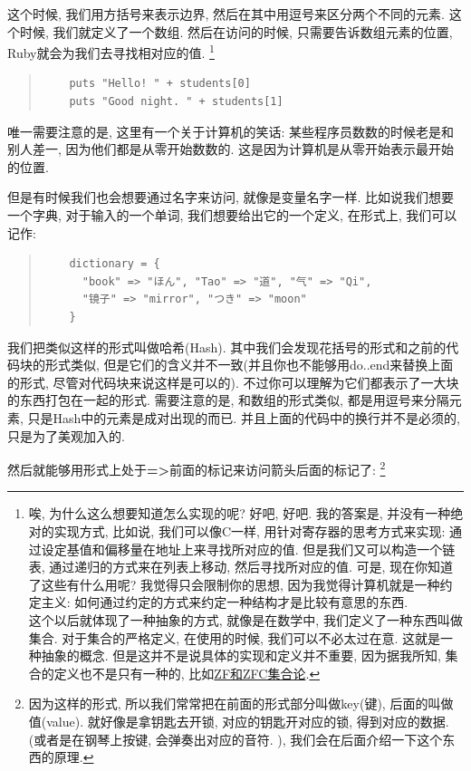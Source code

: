这个时候, 我们用方括号来表示边界, 然后在其中用逗号来区分两个不同的元素. 这个时候, 我们就定义了一个数组. 然后在访问的时候, 只需要告诉数组元素的位置, Ruby就会为我们去寻找相对应的值. \footnote{唉, 为什么这么想要知道怎么实现的呢? 好吧, 好吧. 我的答案是, 并没有一种绝对的实现方式, 比如说, 我们可以像C一样, 用针对寄存器的思考方式来实现: 通过设定基值和偏移量在地址上来寻找所对应的值. 但是我们又可以构造一个链表, 通过递归的方式来在列表上移动, 然后寻找所对应的值. 可是, 现在你知道了这些有什么用呢? 我觉得只会限制你的思想, 因为我觉得计算机就是一种约定主义: 如何通过约定的方式来约定一种结构才是比较有意思的东西. \\ 这个以后就体现了一种抽象的方式, 就像是在数学中, 我们定义了一种东西叫做集合. 对于集合的严格定义, 在使用的时候, 我们可以不必太过在意. 这就是一种抽象的概念. 但是这并不是说具体的实现和定义并不重要, 因为据我所知, 集合的定义也不是只有一种的, 比如\href{https://zh.wikipedia.org/wiki/公理化集合论}{ZF和ZFC集合论}.}

\begin{quotation}
  \begin{verbatim}
    puts "Hello! " + students[0]
    puts "Good night. " + students[1]
  \end{verbatim}
\end{quotation}

唯一需要注意的是, 这里有一个关于计算机的笑话: 某些程序员数数的时候老是和别人差一, 因为他们都是从零开始数数的. 这是因为计算机是从零开始表示最开始的位置. 

但是有时候我们也会想要通过名字来访问, 就像是变量名字一样. 比如说我们想要一个字典, 对于输入的一个单词, 我们想要给出它的一个定义, 在形式上, 我们可以记作: 

\begin{quotation}
  \begin{verbatim}
    dictionary = {
      "book" => "ほん", "Tao" => "道", "气" => "Qi", 
      "镜子" => "mirror", "つき" => "moon"
    }
  \end{verbatim}
\end{quotation}

我们把类似这样的形式叫做哈希(Hash). 其中我们会发现花括号的形式和之前的代码块的形式类似, 但是它们的含义并不一致(并且你也不能够用do..end来替换上面的形式, 尽管对代码块来说这样是可以的). 不过你可以理解为它们都表示了一大块的东西打包在一起的形式. 需要注意的是, 和数组的形式类似, 都是用逗号来分隔元素, 只是Hash中的元素是成对出现的而已. 并且上面的代码中的换行并不是必须的, 只是为了美观加入的. 

然后就能够用形式上处于\textbf{=>}前面的标记来访问箭头后面的标记了: \footnote{因为这样的形式, 所以我们常常把在前面的形式部分叫做key(键), 后面的叫做值(value). 就好像是拿钥匙去开锁, 对应的钥匙开对应的锁, 得到对应的数据. (或者是在钢琴上按键, 会弹奏出对应的音符. ), 我们会在后面介绍一下这个东西的原理. }

